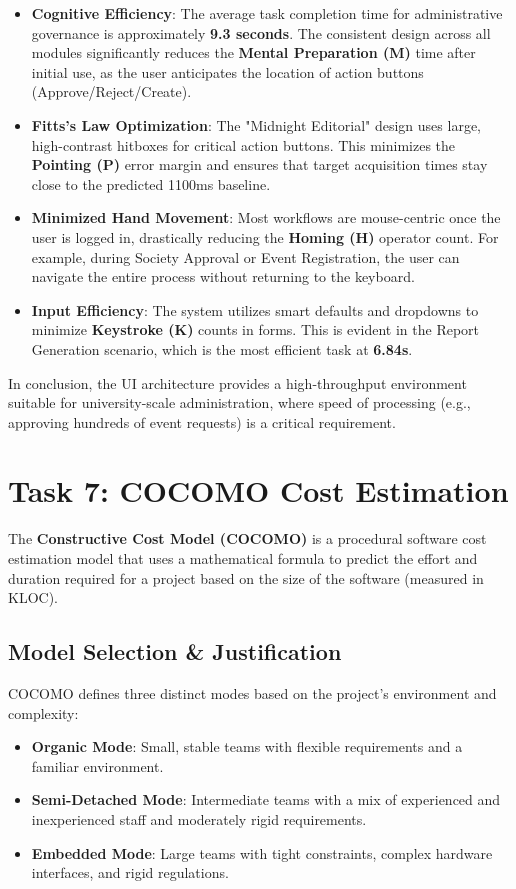 \documentclass[12pt,a4paper]{article}
\begin{document}
\begin{itemize}
    \item \textbf{Cognitive Efficiency}: The average task completion time for administrative governance is approximately \textbf{9.3 seconds}. The consistent design across all modules significantly reduces the \textbf{Mental Preparation (M)} time after initial use, as the user anticipates the location of action buttons (Approve/Reject/Create).
    \item \textbf{Fitts's Law Optimization}: The "Midnight Editorial" design uses large, high-contrast hitboxes for critical action buttons. This minimizes the \textbf{Pointing (P)} error margin and ensures that target acquisition times stay close to the predicted 1100ms baseline.
    \item \textbf{Minimized Hand Movement}: Most workflows are mouse-centric once the user is logged in, drastically reducing the \textbf{Homing (H)} operator count. For example, during Society Approval or Event Registration, the user can navigate the entire process without returning to the keyboard.
    \item \textbf{Input Efficiency}: The system utilizes smart defaults and dropdowns to minimize \textbf{Keystroke (K)} counts in forms. This is evident in the Report Generation scenario, which is the most efficient task at \textbf{6.84s}.
\end{itemize}

In conclusion, the UI architecture provides a high-throughput environment suitable for university-scale administration, where speed of processing (e.g., approving hundreds of event requests) is a critical requirement.

\newpage
\section{Task 7: COCOMO Cost Estimation}
The \textbf{Constructive Cost Model (COCOMO)} is a procedural software cost estimation model that uses a mathematical formula to predict the effort and duration required for a project based on the size of the software (measured in KLOC).

\subsection{Model Selection \& Justification}
COCOMO defines three distinct modes based on the project's environment and complexity:
\begin{itemize}
    \item \textbf{Organic Mode}: Small, stable teams with flexible requirements and a familiar environment.
    \item \textbf{Semi-Detached Mode}: Intermediate teams with a mix of experienced and inexperienced staff and moderately rigid requirements.
    \item \textbf{Embedded Mode}: Large teams with tight constraints, complex hardware interfaces, and rigid regulations.
\end{itemize}
\end{document}
